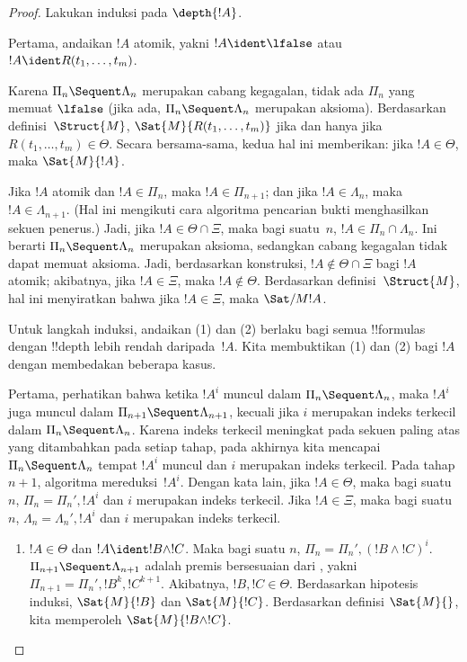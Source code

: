\documentclass[../../../include/open-logic-section]{subfiles}
\begin{document}
\begin{proof}
Lakukan induksi pada $\depth{!A}$.

Pertama, andaikan $!A$ atomik, yakni $!A \ident \lfalse$ atau
$!A \ident R(t_1, \dots, t_m)$.

Karena $\Pi_n \Sequent \Lambda_n$ merupakan cabang kegagalan, tidak ada
$\Pi_n$ yang memuat $\lfalse$ (jika ada, $\Pi_n \Sequent \Lambda_n$
merupakan aksioma). Berdasarkan definisi~$\Struct{M}$,
$\Sat{M}{R(t_1, \dots, t_m)}$ jika dan hanya jika
$R(t_1, \dots, t_m) \in \Theta$. Secara bersama-sama, kedua hal ini
memberikan: jika $!A \in \Theta$, maka $\Sat{M}{!A}$.

Jika $!A$ atomik dan $!A \in \Pi_n$, maka $!A \in \Pi_{n+1}$; dan jika
$!A \in \Lambda_n$, maka $!A \in \Lambda_{n+1}$. (Hal ini mengikuti cara
algoritma pencarian bukti menghasilkan sekuen penerus.) Jadi, jika
$!A \in \Theta \cap \Xi$, maka bagi suatu~$n$,
$!A \in \Pi_n \cap \Lambda_n$. Ini berarti
$\Pi_n \Sequent \Lambda_n$ merupakan aksioma, sedangkan cabang kegagalan
tidak dapat memuat aksioma. Jadi, berdasarkan konstruksi,
$!A \notin \Theta \cap \Xi$ bagi $!A$ atomik; akibatnya, jika
$!A \in \Xi$, maka $!A \notin \Theta$. Berdasarkan definisi~$\Struct{M}$,
hal ini menyiratkan bahwa jika $!A \in \Xi$, maka $\Sat/{M}{!A}$.

Untuk langkah induksi, andaikan (1) dan (2) berlaku bagi semua !!{formula}s
dengan !!{depth} lebih rendah daripada~$!A$. Kita membuktikan (1) dan (2)
bagi $!A$ dengan membedakan beberapa kasus.

Pertama, perhatikan bahwa ketika $!A^i$ muncul dalam
$\Pi_n \Sequent \Lambda_n$, maka $!A^i$ juga muncul dalam
$\Pi_{n+1} \Sequent \Lambda_{n+1}$, kecuali jika $i$ merupakan indeks
terkecil dalam $\Pi_n \Sequent \Lambda_n$. Karena indeks terkecil meningkat
pada sekuen paling atas yang ditambahkan pada setiap tahap, pada akhirnya
kita mencapai $\Pi_n \Sequent \Lambda_n$ tempat $!A^i$ muncul dan $i$
merupakan indeks terkecil. Pada tahap $n+1$, algoritma mereduksi~$!A^i$.
Dengan kata lain, jika $!A \in \Theta$, maka bagi suatu $n$,
$\Pi_n = \Pi_n', !A^i$ dan $i$ merupakan indeks terkecil. Jika
$!A \in \Xi$, maka bagi suatu $n$,
$\Lambda_n = \Lambda_n', !A^i$ dan $i$ merupakan indeks terkecil.

\begin{enumerate}
  \item $!A \in \Theta$ dan $!A \ident !B \land !C$. Maka bagi suatu
  $n$, $\Pi_n = \Pi_n', (!B \land !C)^i$.
  $\Pi_{n+1} \Sequent \Lambda_{n+1}$ adalah premis bersesuaian dari
  \LeftR{\land}, yakni
  $\Pi_{n+1} = \Pi_n', !B^k, !C^{k+1}$. Akibatnya,
  $!B, !C \in \Theta$. Berdasarkan hipotesis induksi,
  $\Sat{M}{!B}$ dan $\Sat{M}{!C}$. Berdasarkan definisi $\Sat{M}{}$,
  kita memperoleh $\Sat{M}{!B \land !C}$.


\end{enumerate}
\end{proof}
\end{document}
